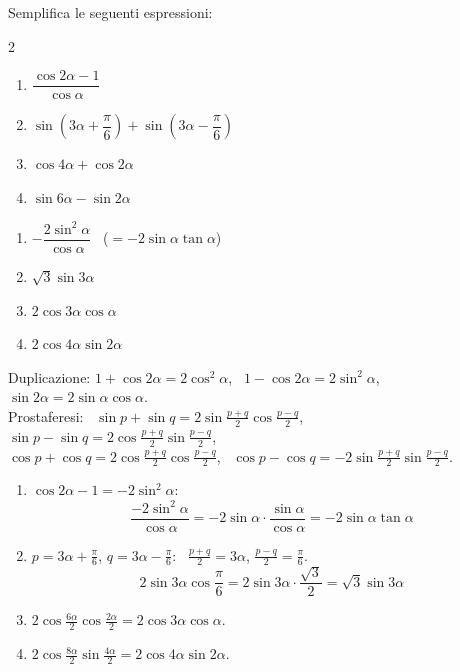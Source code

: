 
\begin{question}[ID=2.5, subtitle={Semplificazione con duplicazione e prostaferesi (terza variante)}, tags={goniometria, formule di duplicazione, prostaferesi}, difficulty=facile]
Semplifica le seguenti espressioni:
\begin{multicols}{2}
\begin{enumerate}
\item $\dfrac{\cos 2\alpha - 1}{\cos \alpha}$
\item $\sin\!\left(3\alpha + \dfrac{\pi}{6}\right) + \sin\!\left(3\alpha - \dfrac{\pi}{6}\right)$
\item $\cos 4\alpha + \cos 2\alpha$
\item $\sin 6\alpha - \sin 2\alpha$
\end{enumerate}
\end{multicols}
\begin{solution}
\begin{enumerate}
    \item $-\dfrac{2\sin^2\alpha}{\cos\alpha}$ \ ($=-2\sin\alpha\tan\alpha$)
    \item $\sqrt3\sin3\alpha$
    \item $2\cos3\alpha\cos\alpha$
    \item $2\cos4\alpha\sin2\alpha$
\end{enumerate}
\end{solution}
\begin{explanation}
Duplicazione: $1+\cos2\alpha=2\cos^2\alpha$, \ $1-\cos2\alpha=2\sin^2\alpha$, \ $\sin2\alpha=2\sin\alpha\cos\alpha$. \\
Prostaferesi: \ $\sin p+\sin q=2\sin\tfrac{p+q}{2}\cos\tfrac{p-q}{2}$, \ $\sin p-\sin q=2\cos\tfrac{p+q}{2}\sin\tfrac{p-q}{2}$, \\
$\cos p+\cos q=2\cos\tfrac{p+q}{2}\cos\tfrac{p-q}{2}$, \ $\cos p-\cos q=-2\sin\tfrac{p+q}{2}\sin\tfrac{p-q}{2}$.
\begin{enumerate}
    \item $\cos2\alpha-1=-2\sin^2\alpha$:
    \[ \dfrac{-2\sin^2\alpha}{\cos\alpha}=-2\sin\alpha\cdot\dfrac{\sin\alpha}{\cos\alpha}=-2\sin\alpha\tan\alpha \]
    \item $p=3\alpha+\tfrac\pi6$, $q=3\alpha-\tfrac\pi6$: \ $\tfrac{p+q}{2}=3\alpha$, $\tfrac{p-q}{2}=\tfrac\pi6$.
    \[ 2\sin3\alpha\cos\dfrac\pi6=2\sin3\alpha\cdot\dfrac{\sqrt3}{2}=\sqrt3\sin3\alpha \]
    \item $2\cos\tfrac{6\alpha}{2}\cos\tfrac{2\alpha}{2}=2\cos3\alpha\cos\alpha$.
    \item $2\cos\tfrac{8\alpha}{2}\sin\tfrac{4\alpha}{2}=2\cos4\alpha\sin2\alpha$.
\end{enumerate}
\end{explanation}
\end{question}

